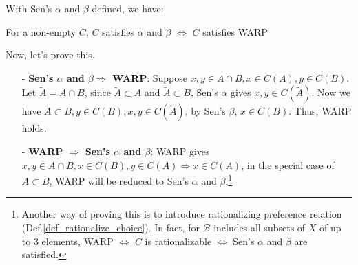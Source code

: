 With Sen's $\alpha$ and $\beta$ defined, we have:
\begin{theorem}
    For a non-empty $C$, $C$ satisfies $\alpha$ and $\beta$ $\Leftrightarrow$ $C$ satisfies WARP
\end{theorem}

Now, let's prove this.
\begin{enumerate}
    \item[-] \textbf{Sen's $\alpha$ and $\beta \Rightarrow$ WARP}: Suppose $x,y\in A\cap B, x\in C(A), y\in C(B)$. Let $\tilde{A}=A\cap B$, since $\tilde{A}\subset A$ and $\tilde{A} \subset B$, Sen's $\alpha$ gives $x,y\in C(\tilde{A})$. Now we have $\tilde{A}\subset B, y\in C(B), x,y\in C(\tilde{A})$, by Sen's $\beta$, $x\in C(B)$. Thus, WARP holds.
    \item[-] \textbf{WARP $\Rightarrow$ Sen's $\alpha$ and $\beta$}: WARP gives $x,y\in A\cap B,x\in C(B), y\in C(A)\Rightarrow x\in C(A)$, in the special case of $A\subset B$, WARP will be reduced to Sen's $\alpha$ and $\beta$.\footnote{Another way of proving this is to introduce rationalizing preference relation (Def.\ref{def_rationalize_choice}). In fact, for $\mathcal{B}$ includes all subsets of $X$ of up to 3 elements, WARP $\Leftrightarrow$ $C$ is rationalizable $\Leftrightarrow$ Sen's $\alpha$ and $\beta$ are satisfied.}
\end{enumerate}